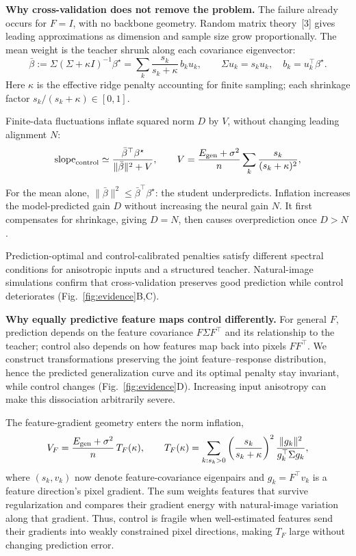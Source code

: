 \documentclass[12pt,a4paper]{article}
\newcommand{\head}[1]{\par\noindent\textbf{#1}\enspace\ignorespaces}
\newcommand{\bt}{\beta^\star}
\newcommand{\mb}{\bar\beta}
\begin{document}
\head{Why cross-validation does not remove the problem.}
The failure already occurs for $F=I$, with no backbone geometry. Random matrix theory~[3] gives leading approximations as dimension and sample size grow proportionally. The mean weight is the teacher shrunk along each covariance eigenvector:
\begin{equation}
\mb:=\Sigma(\Sigma+\kappa I)^{-1}\bt
=\sum_k\frac{s_k}{s_k+\kappa}\,b_k u_k,
\qquad \Sigma u_k=s_k u_k,\quad b_k=u_k^\top\bt.
\label{eq:mean-shrinkage}
\end{equation}
Here $\kappa$ is the effective ridge penalty accounting for finite sampling; each shrinkage factor $s_k/(s_k+\kappa)\in[0,1]$.\par
Finite-data fluctuations inflate squared norm $D$ by $V$, without changing leading alignment $N$:
\begin{equation}
\mathrm{slope}_{\rm control}\simeq
\frac{\mb^\top\bt}{\|\mb\|^2+V},
\qquad
V=\frac{E_{\rm gen}+\sigma^2}{n}
\sum_k\frac{s_k}{(s_k+\kappa)^2},
\label{eq:inflation}
\end{equation}\par
For the mean alone, $\|\mb\|^2\le\mb^\top\bt$: the student underpredicts. Inflation increases the model-predicted gain $D$ without increasing the neural gain $N$. It first compensates for shrinkage, giving $D=N$, then causes overprediction once $D>N$.\par
Prediction-optimal and control-calibrated penalties satisfy different spectral conditions for anisotropic inputs and a structured teacher. Natural-image simulations confirm that cross-validation preserves good prediction while control deteriorates (Fig.~\ref{fig:evidence}B,C).\par

\head{Why equally predictive feature maps control differently.}
For general $F$, prediction depends on the feature covariance $F\Sigma F^\top$ and its relationship to the teacher; control also depends on how features map back into pixels $FF^\top$. We construct transformations preserving the joint feature--response distribution, hence the predicted generalization curve and its optimal penalty stay invariant, while control changes (Fig.~\ref{fig:evidence}D). Increasing input anisotropy can make this dissociation arbitrarily severe.

The feature-gradient geometry enters the norm inflation, 
\begin{equation}
V_F=\frac{E_{\rm gen}+\sigma^2}{n}\,T_F(\kappa),
\qquad
T_F(\kappa)=\sum_{k:s_k>0}
\left(\frac{s_k}{s_k+\kappa}\right)^2
\frac{\|g_k\|^2}{g_k^\top\Sigma g_k},
\label{eq:features}
\end{equation}
where $(s_k,v_k)$ now denote feature-covariance eigenpairs and $g_k=F^\top v_k$ is a feature direction's pixel gradient. The sum weights features that survive regularization and compares their gradient energy with natural-image variation along that gradient. Thus, control is fragile when well-estimated features send their gradients into weakly constrained pixel directions, making $T_F$ large without changing prediction error.
\end{document}
